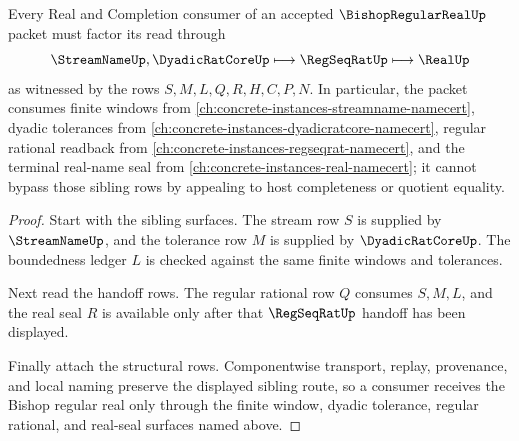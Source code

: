 \begin{theorem}
\label{thm:bounded-cauchy-modulus-real-sibling-route}
Every Real and Completion consumer of an accepted $\BishopRegularRealUp$ packet must factor its read through
$$
\StreamNameUp,\DyadicRatCoreUp \longmapsto \RegSeqRatUp \longmapsto \RealUp
$$
as witnessed by the rows $S,M,L,Q,R,H,C,P,N$. In particular, the packet consumes finite windows from \autoref{ch:concrete-instances-streamname-namecert}, dyadic tolerances from \autoref{ch:concrete-instances-dyadicratcore-namecert}, regular rational readback from \autoref{ch:concrete-instances-regseqrat-namecert}, and the terminal real-name seal from \autoref{ch:concrete-instances-real-namecert}; it cannot bypass those sibling rows by appealing to host completeness or quotient equality.
\end{theorem}
\begin{proof}
Start with the sibling surfaces. The stream row $S$ is supplied by $\StreamNameUp$, and the tolerance row $M$ is supplied by $\DyadicRatCoreUp$. The boundedness ledger $L$ is checked against the same finite windows and tolerances.

Next read the handoff rows. The regular rational row $Q$ consumes $S,M,L$, and the real seal $R$ is available only after that $\RegSeqRatUp$ handoff has been displayed.

Finally attach the structural rows. Componentwise transport, replay, provenance, and local naming preserve the displayed sibling route, so a consumer receives the Bishop regular real only through the finite window, dyadic tolerance, regular rational, and real-seal surfaces named above.
\end{proof}




